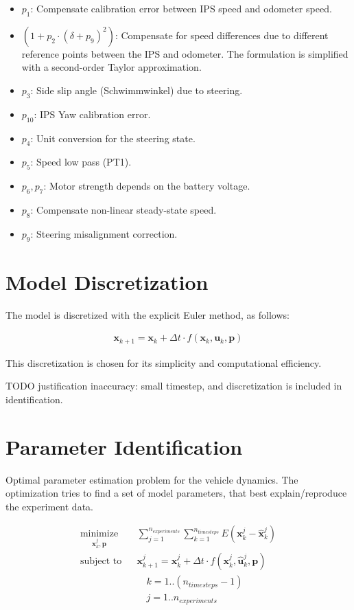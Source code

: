 \documentclass[12pt]{article}
\begin{document}
\begin{itemize}
\item $p_1$: Compensate calibration error between IPS speed and odometer speed. 
\item $(1+p_2 \cdot (\delta + p_{9})^2)$: Compensate for speed differences due to different reference points between the IPS and odometer. The formulation is simplified with a second-order Taylor approximation.
\item $p_3$: Side slip angle (Schwimmwinkel) due to steering.
\item $p_{10}$: IPS Yaw calibration error.
\item $p_{4}$: Unit conversion for the steering state.
\item $p_{5}$: Speed low pass (PT1).
\item $p_{6}, p_{7}$: Motor strength depends on the battery voltage.
\item $p_{8}$: Compensate non-linear steady-state speed.
\item $p_{9}$: Steering misalignment correction.
\end{itemize}


\section{Model Discretization}

The model is discretized with the explicit Euler method, as follows:

\begin{align}
\boldsymbol{x}_{k+1} = \boldsymbol{x}_k + \Delta t \cdot f(\boldsymbol{x}_k,  \boldsymbol{u}_k, \boldsymbol{p}) 
\end{align}

This discretization is chosen for its simplicity and computational efficiency.

TODO justification inaccuracy: small timestep, and discretization is included in identification.

\section{Parameter Identification}

Optimal parameter estimation problem for the vehicle dynamics. The optimization tries to find a set of model parameters, that best explain/reproduce the experiment data.

\begin{align}
\underset{\boldsymbol{x}_k^j, \boldsymbol{p}}{\text{minimize}} && \sum_{j=1}^{n_{experiments}} \sum_{k=1}^{n_{timesteps}} E(\boldsymbol{x}_k^j - \hat{\boldsymbol{x}}_k^j) \\
\text{subject to} &&  \boldsymbol{x}_{k+1}^j = \boldsymbol{x}_k^j + \Delta t \cdot f(\boldsymbol{x}_k^j,  \hat{\boldsymbol{u}}_k^j, \boldsymbol{p}) \\
&& \quad k=1..(n_{timesteps}-1) \\
&& \quad j=1..n_{experiments} \\
\end{align} 
\end{document}
